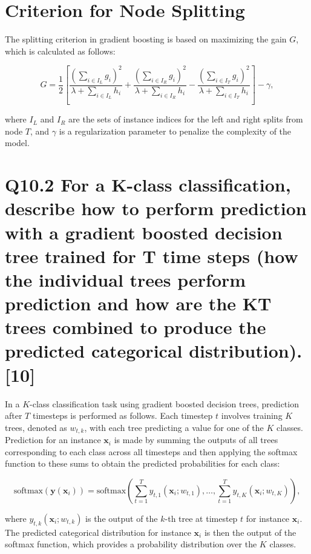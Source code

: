 \documentclass[11pt]{article}
\begin{document}
\section{Criterion for Node Splitting}

The splitting criterion in gradient boosting is based on maximizing the gain $G$, which is calculated as follows:

\begin{equation}
G = \frac{1}{2} \left[ \frac{(\sum_{i \in I_L} g_i)^2}{\lambda + \sum_{i \in I_L} h_i} + \frac{(\sum_{i \in I_R} g_i)^2}{\lambda + \sum_{i \in I_R} h_i} - \frac{(\sum_{i \in I_T} g_i)^2}{\lambda + \sum_{i \in I_T} h_i} \right] - \gamma,
\end{equation}

where $I_L$ and $I_R$ are the sets of instance indices for the left and right splits from node $T$, and $\gamma$ is a regularization parameter to penalize the complexity of the model.

\section{Q10.2 For a K-class classification, describe how to perform prediction with a gradient boosted decision tree trained for T time steps (how the individual trees perform prediction and how are the KT trees combined to produce the predicted categorical distribution). [10]}

In a \( K \)-class classification task using gradient boosted decision trees, prediction after \( T \) timesteps is performed as follows. Each timestep \( t \) involves training \( K \) trees, denoted as \( w_{t,k} \), with each tree predicting a value for one of the \( K \) classes. Prediction for an instance \( \mathbf{x}_i \) is made by summing the outputs of all trees corresponding to each class across all timesteps and then applying the softmax function to these sums to obtain the predicted probabilities for each class:

\begin{equation}
\text{softmax}(\mathbf{y}(\mathbf{x}_i)) = \text{softmax} \left( \sum_{t=1}^{T} y_{t,1}(\mathbf{x}_i; w_{t,1}), \ldots, \sum_{t=1}^{T} y_{t,K}(\mathbf{x}_i; w_{t,K}) \right),
\end{equation}

where \( y_{t,k}(\mathbf{x}_i; w_{t,k}) \) is the output of the \( k \)-th tree at timestep \( t \) for instance \( \mathbf{x}_i \). The predicted categorical distribution for instance \( \mathbf{x}_i \) is then the output of the softmax function, which provides a probability distribution over the \( K \) classes.
\end{document}
